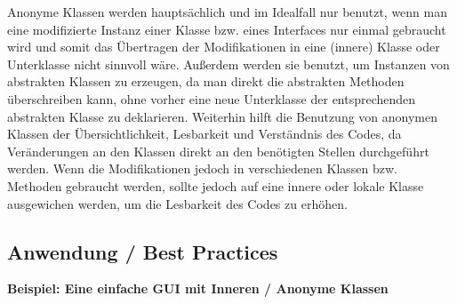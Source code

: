 Anonyme Klassen werden hauptsächlich und im Idealfall nur benutzt, wenn man eine modifizierte Instanz einer Klasse bzw. eines Interfaces nur einmal gebraucht wird und somit das Übertragen der Modifikationen in eine (innere) Klasse oder Unterklasse nicht sinnvoll wäre.
Außerdem werden sie benutzt, um Instanzen von abstrakten Klassen zu erzeugen, da man direkt die abstrakten Methoden überschreiben kann, ohne vorher eine neue Unterklasse der entsprechenden abstrakten Klasse zu deklarieren.
Weiterhin hilft die Benutzung von anonymen Klassen der Übersichtlichkeit, Lesbarkeit und Verständnis des Codes, da Veränderungen an den Klassen direkt an den benötigten Stellen durchgeführt werden.
Wenn die Modifikationen jedoch in verschiedenen Klassen bzw. Methoden gebraucht werden, sollte jedoch auf eine innere oder lokale Klasse ausgewichen werden, um die Lesbarkeit des Codes zu erhöhen.
\newpage
\subsection{Anwendung / Best Practices}




{\bf Beispiel: Eine einfache GUI mit Inneren / Anonyme Klassen}


